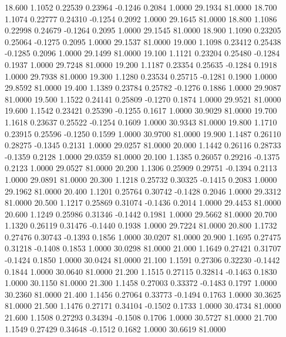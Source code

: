   18.600   1.1052   0.22539   0.23964  -0.1246   0.2084   1.0000  29.1934  81.0000
  18.700   1.1074   0.22777   0.24310  -0.1254   0.2092   1.0000  29.1645  81.0000
  18.800   1.1086   0.22998   0.24679  -0.1264   0.2095   1.0000  29.1545  81.0000
  18.900   1.1090   0.23205   0.25064  -0.1275   0.2095   1.0000  29.1537  81.0000
  19.000   1.1098   0.23412   0.25438  -0.1285   0.2096   1.0000  29.1499  81.0000
  19.100   1.1121   0.23204   0.25480  -0.1284   0.1937   1.0000  29.7248  81.0000
  19.200   1.1187   0.23354   0.25635  -0.1284   0.1918   1.0000  29.7938  81.0000
  19.300   1.1280   0.23534   0.25715  -0.1281   0.1900   1.0000  29.8592  81.0000
  19.400   1.1389   0.23784   0.25782  -0.1276   0.1886   1.0000  29.9087  81.0000
  19.500   1.1522   0.24141   0.25809  -0.1270   0.1874   1.0000  29.9521  81.0000
  19.600   1.1542   0.23421   0.25390  -0.1255   0.1617   1.0000  30.9029  81.0000
  19.700   1.1618   0.23637   0.25522  -0.1254   0.1609   1.0000  30.9343  81.0000
  19.800   1.1710   0.23915   0.25596  -0.1250   0.1599   1.0000  30.9700  81.0000
  19.900   1.1487   0.26110   0.28275  -0.1345   0.2131   1.0000  29.0257  81.0000
  20.000   1.1442   0.26116   0.28733  -0.1359   0.2128   1.0000  29.0359  81.0000
  20.100   1.1385   0.26057   0.29216  -0.1375   0.2123   1.0000  29.0527  81.0000
  20.200   1.1306   0.25909   0.29751  -0.1394   0.2113   1.0000  29.0891  81.0000
  20.300   1.1218   0.25732   0.30325  -0.1415   0.2083   1.0000  29.1962  81.0000
  20.400   1.1201   0.25764   0.30742  -0.1428   0.2046   1.0000  29.3312  81.0000
  20.500   1.1217   0.25869   0.31074  -0.1436   0.2014   1.0000  29.4453  81.0000
  20.600   1.1249   0.25986   0.31346  -0.1442   0.1981   1.0000  29.5662  81.0000
  20.700   1.1320   0.26119   0.31476  -0.1440   0.1938   1.0000  29.7224  81.0000
  20.800   1.1732   0.27476   0.30743  -0.1393   0.1856   1.0000  30.0207  81.0000
  20.900   1.1695   0.27475   0.31218  -0.1408   0.1853   1.0000  30.0298  81.0000
  21.000   1.1649   0.27421   0.31707  -0.1424   0.1850   1.0000  30.0424  81.0000
  21.100   1.1591   0.27306   0.32230  -0.1442   0.1844   1.0000  30.0640  81.0000
  21.200   1.1515   0.27115   0.32814  -0.1463   0.1830   1.0000  30.1150  81.0000
  21.300   1.1458   0.27003   0.33372  -0.1483   0.1797   1.0000  30.2360  81.0000
  21.400   1.1456   0.27064   0.33773  -0.1494   0.1763   1.0000  30.3625  81.0000
  21.500   1.1476   0.27171   0.34104  -0.1502   0.1733   1.0000  30.4734  81.0000
  21.600   1.1508   0.27293   0.34394  -0.1508   0.1706   1.0000  30.5727  81.0000
  21.700   1.1549   0.27429   0.34648  -0.1512   0.1682   1.0000  30.6619  81.0000
